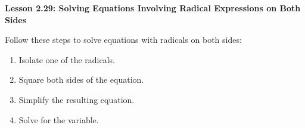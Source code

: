 \begin{center}
\textbf{Lesson 2.29: Solving Equations Involving Radical Expressions on Both Sides}
\end{center}

\vspace*{1ex}

\noindent Follow these steps to solve equations with radicals on both sides:
\begin{enumerate}[noitemsep, label = \color{blue}\arabic*. ]
    \item Isolate one of the radicals.   
    \item Square both sides of the equation.   
    \item Simplify the resulting equation.   
    \item Solve for the variable.
\end{enumerate}

